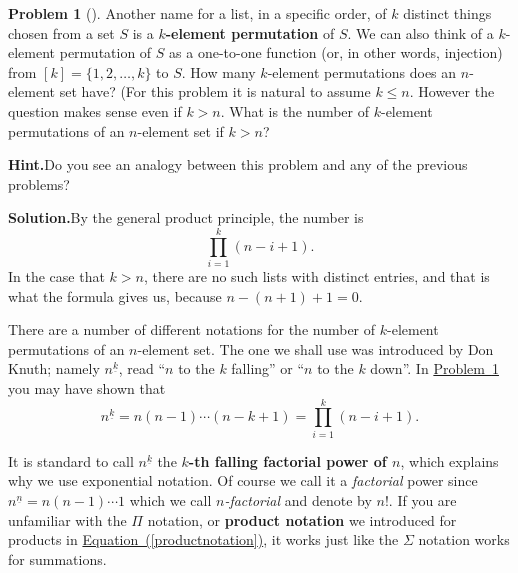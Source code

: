 \documentclass[10pt,]{book}
\newcommand{\terminology}[1]{\textbf{#1}}
\theoremstyle{plain}
\theoremstyle{definition}
\newtheorem{activity}[project]{Problem}
\theoremstyle{definition}
\numberwithin{equation}{chapter}
\begin{document}
\begin{activity}[]\label{kelementpermutation}
Another name for a list, in a specific order, of \(k\) distinct things chosen from a set \(S\) is a \terminology{\(k\)-element permutation} of \(S\). We can also think of a \(k\)-element permutation of \(S\) as a one-to-one function (or, in other words, injection) from \([k]=\{1,2,\ldots, k\}\) to \(S\). How many \(k\)-element permutations does an \(n\)-element set have? (For this problem it is natural to assume \(k\le n\). However the question makes sense even if \(k>n\). What is the number of \(k\)-element permutations of an \(n\)-element set if \(k>n\)?%
\par\medskip\noindent%
\textbf{Hint.}\quad Do you see an analogy between this problem and any of the previous problems?%
\par\medskip\noindent%
\textbf{Solution.}\quad By the general product principle, the number is%
\begin{equation*}
\prod_{i=1}^k(n-i+1).
\end{equation*}
In the case that \(k>n\), there are no such lists with distinct entries, and that is what the formula gives us, because \(n-(n+1)+1=0\).%
\end{activity}
There are a number of different notations for the number of \(k\)-element permutations of an \(n\)-element set. The one we shall use was introduced by Don Knuth; namely \(n^{\underline{k}}\), read ``\(n\) to the \(k\) falling'' or ``\(n\) to the \(k\) down''. In \hyperref[kelementpermutation]{Problem~\ref{kelementpermutation}} you may have shown that%
\begin{equation}
n^{\underline{k}} =n(n-1)\cdots (n-k+1)= \prod_{i=1}^k(
n-i+1).\label{productnotation}
\end{equation}
%
\par
It is standard to call \(n^{\underline{k}}\) the \terminology{\(k\)-th falling factorial power of \(n\)}, which explains why we use exponential notation. Of course we call it a \emph{factorial} power since \(n^{\underline{n}} = n(n-1)\cdots 1\) which we call \emph{\(n\)-factorial} and denote by \(n!\). If you are unfamiliar with the \(\Pi\) notation, or \terminology{product notation} we introduced for products in \hyperref[productnotation]{Equation~(\ref{productnotation})}, it works just like the \(\Sigma\) notation works for summations.%
\end{document}
